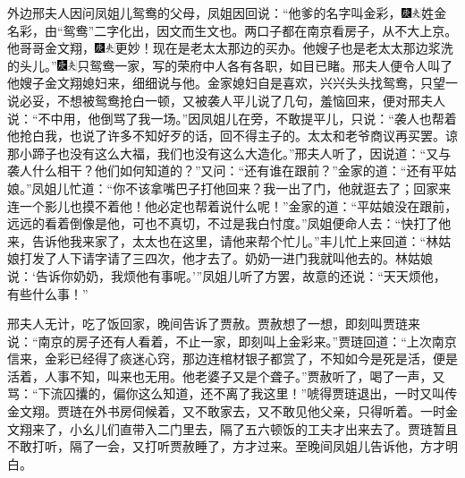 外边邢夫人因问凤姐儿鸳鸯的父母，凤姐因回说：“他爹的名字叫金彩，{\includegraphics[width=3mm]{../Images/00004}\includegraphics[width=3mm]{../Images/00012}\footnotesize \kaishu 姓金名彩，由“鸳鸯”二字化出，因文而生文也。}两口子都在南京看房子，从不大上京。他哥哥金文翔，{\includegraphics[width=3mm]{../Images/00004}\includegraphics[width=3mm]{../Images/00012}\footnotesize \kaishu 更妙！}现在是老太太那边的买办。他嫂子也是老太太那边浆洗的头儿。”{\includegraphics[width=3mm]{../Images/00004}\includegraphics[width=3mm]{../Images/00012}\footnotesize \kaishu 只鸳鸯一家，写的荣府中人各有各职，如目已睹。}邢夫人便令人叫了他嫂子金文翔媳妇来，细细说与他。金家媳妇自是喜欢，兴兴头头找鸳鸯，只望一说必妥，不想被鸳鸯抢白一顿，又被袭人平儿说了几句，羞恼回来，便对邢夫人说：“不中用，他倒骂了我一场。”因凤姐儿在旁，不敢提平儿，只说：“袭人也帮着他抢白我，也说了许多不知好歹的话，回不得主子的。太太和老爷商议再买罢。谅那小蹄子也没有这么大福，我们也没有这么大造化。”邢夫人听了，因说道：“又与袭人什么相干？他们如何知道的？”又问：“还有谁在跟前？”金家的道：“还有平姑娘。”凤姐儿忙道：“你不该拿嘴巴子打他回来？我一出了门，他就逛去了；回家来连一个影儿也摸不着他！他必定也帮着说什么呢！”金家的道：“平姑娘没在跟前，远远的看着倒像是他，可也不真切，不过是我白忖度。”凤姐便命人去：“快打了他来，告诉他我来家了，太太也在这里，请他来帮个忙儿。”丰儿忙上来回道：“林姑娘打发了人下请字请了三四次，他才去了。奶奶一进门我就叫他去的。林姑娘说：‘告诉你奶奶，我烦他有事呢。’”凤姐儿听了方罢，故意的还说：“天天烦他，有些什么事！”

邢夫人无计，吃了饭回家，晚间告诉了贾赦。贾赦想了一想，即刻叫贾琏来说：“南京的房子还有人看着，不止一家，即刻叫上金彩来。”贾琏回道：“上次南京信来，金彩已经得了痰迷心窍，那边连棺材银子都赏了，不知如今是死是活，便是活着，人事不知，叫来也无用。他老婆子又是个聋子。”贾赦听了，喝了一声，又骂：“下流囚攮的，偏你这么知道，还不离了我这里！”唬得贾琏退出，一时又叫传金文翔。贾琏在外书房伺候着，又不敢家去，又不敢见他父亲，只得听着。一时金文翔来了，小幺儿们直带入二门里去，隔了五六顿饭的工夫才出来去了。贾琏暂且不敢打听，隔了一会，又打听贾赦睡了，方才过来。至晚间凤姐儿告诉他，方才明白。

